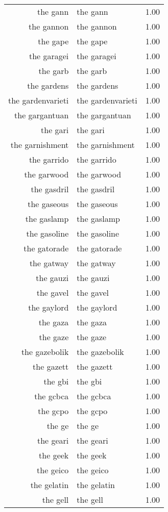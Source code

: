 \begin{table}[ht]
\begin{tabular}{rlr}
  the gann & the gann & 1.00 \\ 
  the gannon & the gannon & 1.00 \\ 
  the gape & the gape & 1.00 \\ 
  the garagei & the garagei & 1.00 \\ 
  the garb & the garb & 1.00 \\ 
  the gardens & the gardens & 1.00 \\ 
  the gardenvarieti & the gardenvarieti & 1.00 \\ 
  the gargantuan & the gargantuan & 1.00 \\ 
  the gari & the gari & 1.00 \\ 
  the garnishment & the garnishment & 1.00 \\ 
  the garrido & the garrido & 1.00 \\ 
  the garwood & the garwood & 1.00 \\ 
  the gasdril & the gasdril & 1.00 \\ 
  the gaseous & the gaseous & 1.00 \\ 
  the gaslamp & the gaslamp & 1.00 \\ 
  the gasoline & the gasoline & 1.00 \\ 
  the gatorade & the gatorade & 1.00 \\ 
  the gatway & the gatway & 1.00 \\ 
  the gauzi & the gauzi & 1.00 \\ 
  the gavel & the gavel & 1.00 \\ 
  the gaylord & the gaylord & 1.00 \\ 
  the gaza & the gaza & 1.00 \\ 
  the gaze & the gaze & 1.00 \\ 
  the gazebolik & the gazebolik & 1.00 \\ 
  the gazett & the gazett & 1.00 \\ 
  the gbi & the gbi & 1.00 \\ 
  the gcbca & the gcbca & 1.00 \\ 
  the gcpo & the gcpo & 1.00 \\ 
  the ge & the ge & 1.00 \\ 
  the geari & the geari & 1.00 \\ 
  the geek & the geek & 1.00 \\ 
  the geico & the geico & 1.00 \\ 
  the gelatin & the gelatin & 1.00 \\ 
  the gell & the gell & 1.00 \\ 

\end{tabular}
\end{table}
